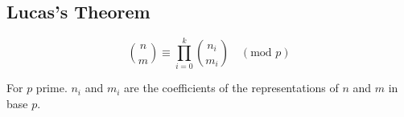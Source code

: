 \subsection{Lucas's Theorem}

\[ \binom{n}{m} \equiv \prod_{i=0}^k \binom{n_i}{m_i} \quad (\text{mod } p) \]

For $p$ prime. $n_i$ and $m_i$ are the coefficients of the representations of $n$    and $m$ in base $p$.
